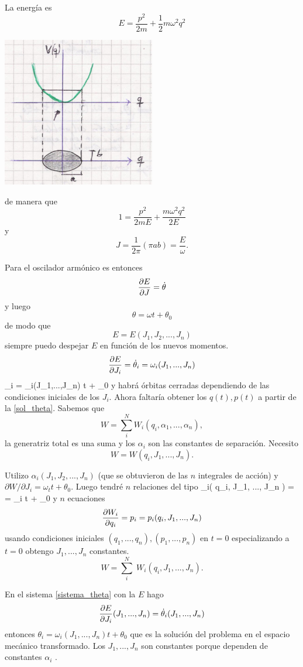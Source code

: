 \documentclass[10pt,oneside]{CBFT_book}
\begin{document}
La energía es
\[
	E = \frac{p^2}{2m} + \frac{1}{2} m \omega^2 q^2
\]
 
\includegraphics[width=0.5\textwidth]{images/fig_mc_osciladorarm_angacc.jpg}

de manera que
\[
	1 = \frac{p^2}{2mE} + \frac{m\omega^2 q^2}{2E}
\]
y
\[
	J = \frac{1}{2\pi}(\pi a b )= \frac{E}{\omega}.
\]

Para el oscilador armónico es entonces
\[
	\frac{\partial^{\hspace{-0.05em}} {E}}{\partial {J}^{\hspace{-0.05em}}} = \dot{\theta}
\]
y luego
\[
	\theta = \omega t + \theta_0
\]
de modo que 
\[
	E = E(J_1, J_2, ..., J_n)
\]
siempre puedo despejar $E$ en función de los nuevos momentos.
\[
	\frac{\partial^{\hspace{-0.05em}} {E}}{\partial {J_i}^{\hspace{-0.05em}}} = \dot{\theta}_i = \omega_i(J_1,...,J_n)
\]
\be
	\theta_i = \omega_i(J_1,...,J_n) t + \theta_0
	\label{sol_theta}
\ee
y habrá órbitas cerradas dependiendo de las condiciones iniciales de los $J_i$.
Ahora faltaría obtener los $q(t),p(t)$ a partir de la  \eqref{sol_theta}. Sabemos que 
\[
	W = \sum_i^N W_i(q_i,\alpha_1,...,\alpha_n),
\]
la generatriz total es una suma y los $\alpha_i$ son las constantes de separación. Necesito
\[
	W = W( q_i, J_1, ..., J_n ).
\]

Utilizo $\alpha_i( J_1, J_2, ..., J_n )$ (que se obtuvieron de las $n$ integrales de acción) y $\partial W /\partial J_i = \omega_t t + \theta_0 $.
Luego tendré $n$ relaciones del tipo
\be
	\theta_i( q_i, J_1, ..., J_n ) =  = \omega_i t + \theta_0
	\label{sistema_theta}
\ee
y $n$ ecuaciones 
\[
	\frac{\partial^{\hspace{-0.05em}} {W_i}}{\partial {q_i}^{\hspace{-0.05em}}} = p_i = p_i( q_i, J_1, ..., J_n ) 
\]
usando condiciones iniciales $(q_1, ..., q_n), (p_1, ..., p_n)$ en $t=0$ especializando a $t=0$ obtengo $J_1, ..., J_n$ constantes.
\[
	W = \sum_i^N \; W_i(q_i,J_1,...,J_n). 
\]

En el sistema \eqref{sistema_theta} con la $E$ hago 
\[
	\frac{\partial^{\hspace{-0.05em}} {E}}{\partial {J_i}^{\hspace{-0.05em}}}(J_1,...,J_n) = \dot{\theta}_i(J_1,...,J_n)
\]
entonces $\theta_i = \omega_i (J_1,...,J_n) t + \theta_0$ que es la solución del problema en el espacio mecánico transformado.
Los $J_1,...,J_n$ son constantes porque dependen de constantes $\alpha_i$ .
\end{document}
